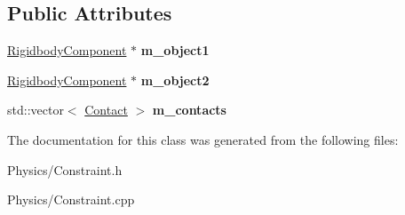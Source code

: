 \subsection*{Public Attributes}
\begin{DoxyCompactItemize}
\item 
\mbox{\label{classContactManifold_a38bf798af49f4baf9d93776b598cc437}} 
\hyperlink{classRigidbodyComponent}{Rigidbody\+Component} $\ast$ {\bfseries m\+\_\+object1}
\item 
\mbox{\label{classContactManifold_a5642b4bfd7ba7adac716f9d48b4a8e6b}} 
\hyperlink{classRigidbodyComponent}{Rigidbody\+Component} $\ast$ {\bfseries m\+\_\+object2}
\item 
\mbox{\label{classContactManifold_ad70b47677c91962e00b27d8e30dacade}} 
std\+::vector$<$ \hyperlink{classContact}{Contact} $>$ {\bfseries m\+\_\+contacts}
\end{DoxyCompactItemize}


The documentation for this class was generated from the following files\+:\begin{DoxyCompactItemize}
\item 
Physics/Constraint.\+h\item 
Physics/Constraint.\+cpp\end{DoxyCompactItemize}
